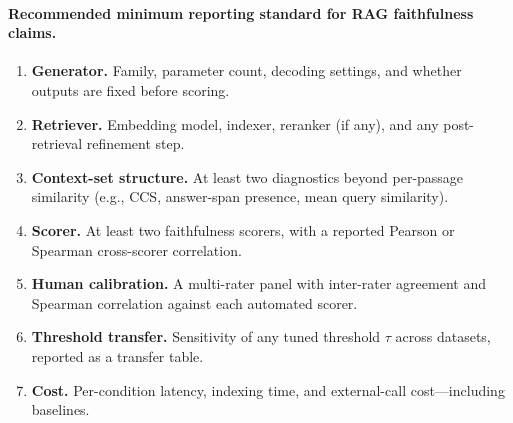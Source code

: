 \paragraph{Recommended minimum reporting standard for RAG faithfulness
claims.}
\begin{enumerate}
  \item \textbf{Generator.} Family, parameter count, decoding settings,
        and whether outputs are fixed before scoring.
  \item \textbf{Retriever.} Embedding model, indexer, reranker (if
        any), and any post-retrieval refinement step.
  \item \textbf{Context-set structure.} At least two diagnostics beyond
        per-passage similarity (e.g., CCS, answer-span presence, mean
        query similarity).
  \item \textbf{Scorer.} At least two faithfulness scorers, with a
        reported Pearson or Spearman cross-scorer correlation.
  \item \textbf{Human calibration.} A multi-rater panel with inter-rater
        agreement and Spearman correlation against each automated scorer.
  \item \textbf{Threshold transfer.} Sensitivity of any tuned threshold
        $\tau$ across datasets, reported as a transfer table.
  \item \textbf{Cost.} Per-condition latency, indexing time, and
        external-call cost---including baselines.
\end{enumerate}

